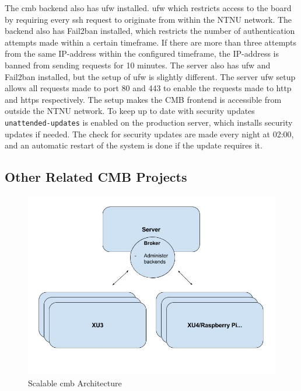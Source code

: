 The \gls{cmb} backend also has \gls{ufw} \cite{UFW} installed. \gls{ufw} which restricts access to the board by requiring every \gls{ssh} request to originate from within the NTNU network. The backend also has Fail2ban  \cite{FAIL2BAN} installed, which restricts the number of authentication attempts made within a certain timeframe. If there are more than three attempts from the same IP-address within the configured timeframe, the IP-address is banned from sending requests for 10 minutes. The server also has \gls{ufw} and Fail2ban installed, but the setup of \gls{ufw} is slightly different. The server \gls{ufw} setup allows all requests made to port 80 and 443 to enable the requests made to \gls{http} and \gls{https} respectively. The setup makes the CMB frontend is accessible from outside the NTNU network. To keep up to date with security updates \texttt{unattended-updates} \cite{UNATTENDED} is enabled on the production server, which installs security updates if needed. The check for security updates are made every night at 02:00, and an automatic restart of the system is done if the update requires it.


\subsection{Other Related CMB Projects}
\label{subsec:related-proj}
\begin{figure}[ct!]
  \includegraphics[width=1.0\textwidth]{figs/cmb_scale_arch.jpg}
  \caption[Scalable \gls{cmb} Architecture]{Scalable \gls{cmb} Architecture}
  \label{fig:cmb-scale-arch}
\end{figure}

